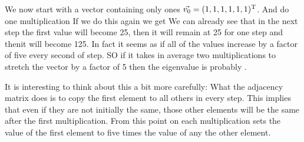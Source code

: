 We now start with a vector containing only ones $\vec{v_0} = (1,1,1,1,1,1)^{\rm T}$. And do one multiplication
If we do this again we get 
We can already see that in the next step the first value will become 25, then it will remain at 25 for one step and thenit will become 125. In fact it seems as if all of the values increase by a factor of five every second of step. SO if it takes in average two multiplications to stretch the vector by a factor of 5 then the eigenvalue is probably 
. 

It is interesting to think about this a bit more carefully: What the adjacency matrix does is to copy the first element to all others in every step. This implies that even if they are not initially the same, those other elements will be the same after the first multiplication. From this point on each multiplication sets the value of the first element to five times the value of any the other element.

